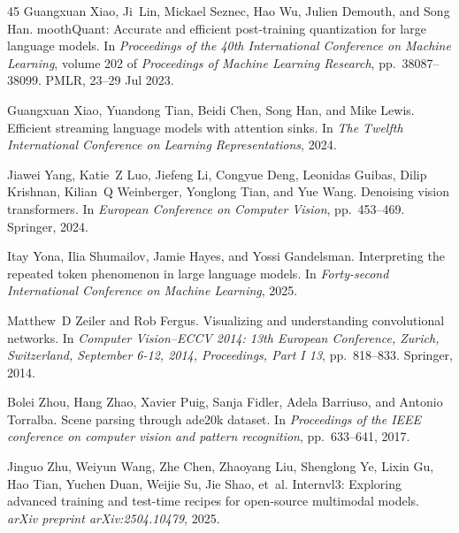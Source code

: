 \documentclass{article}
\begin{document}
\begin{thebibliography}{45}
Guangxuan Xiao, Ji~Lin, Mickael Seznec, Hao Wu, Julien Demouth, and Song Han.
mooth{Q}uant: Accurate and efficient post-training quantization for large language models.
\newblock In \emph{Proceedings of the 40th International Conference on Machine Learning}, volume 202 of \emph{Proceedings of Machine Learning Research}, pp.\  38087--38099. PMLR, 23--29 Jul 2023.

Guangxuan Xiao, Yuandong Tian, Beidi Chen, Song Han, and Mike Lewis.
\newblock Efficient streaming language models with attention sinks.
\newblock In \emph{The Twelfth International Conference on Learning Representations}, 2024.

Jiawei Yang, Katie~Z Luo, Jiefeng Li, Congyue Deng, Leonidas Guibas, Dilip Krishnan, Kilian~Q Weinberger, Yonglong Tian, and Yue Wang.
\newblock Denoising vision transformers.
\newblock In \emph{European Conference on Computer Vision}, pp.\  453--469. Springer, 2024.

Itay Yona, Ilia Shumailov, Jamie Hayes, and Yossi Gandelsman.
\newblock Interpreting the repeated token phenomenon in large language models.
\newblock In \emph{Forty-second International Conference on Machine Learning}, 2025.

Matthew~D Zeiler and Rob Fergus.
\newblock Visualizing and understanding convolutional networks.
\newblock In \emph{Computer Vision--ECCV 2014: 13th European Conference, Zurich, Switzerland, September 6-12, 2014, Proceedings, Part I 13}, pp.\  818--833. Springer, 2014.

Bolei Zhou, Hang Zhao, Xavier Puig, Sanja Fidler, Adela Barriuso, and Antonio Torralba.
\newblock Scene parsing through ade20k dataset.
\newblock In \emph{Proceedings of the IEEE conference on computer vision and pattern recognition}, pp.\  633--641, 2017.

Jinguo Zhu, Weiyun Wang, Zhe Chen, Zhaoyang Liu, Shenglong Ye, Lixin Gu, Hao Tian, Yuchen Duan, Weijie Su, Jie Shao, et~al.
\newblock Internvl3: Exploring advanced training and test-time recipes for open-source multimodal models.
\newblock \emph{arXiv preprint arXiv:2504.10479}, 2025.

\end{thebibliography}
 
\end{document}
